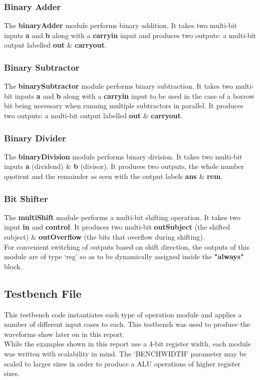 \documentclass[12pt]{article}
\begin{document}
\subsubsection{Binary Adder}
The \textbf{binaryAdder} module performs binary addition. It takes two multi-bit inputs \textbf{a} and \textbf{b} along with a \textbf{carryin} input and produces two outputs: a multi-bit output labelled \textbf{out} \& \textbf{carryout}.



\subsubsection{Binary Subtractor}
The \textbf{binarySubtractor}  module performs binary subtraction. It takes two multi-bit inputs \textbf{a} and \textbf{b} along with a \textbf{carryin} input to be used in the case of a borrow bit being necessary when running multiple subtractors in parallel. It produces two outputs: a multi-bit output labelled \textbf{out} \& \textbf{carryout}.


\subsubsection{Binary Divider}
The \textbf{binaryDivision} module performs binary division. It takes two multi-bit inputs \textbf{a} (dividend) \& \textbf{b} (divisor). It produces two outputs, the whole number quotient and the remainder as seen with the output labels \textbf{ans} \& \textbf{rem}.


\subsubsection{Bit Shifter}
The \textbf{multiShift} module performs a multi-bit shifting operation. It takes two input \textbf{in} and \textbf{control}.
It produces two multi-bit \textbf{outSubject} (the shifted subject) \& \textbf{outOverflow} (the bits that overflow during shifting).\\
For convenient switching of outputs based on shift direction, 
the outputs of this module are of type `reg' so as to be dynamically assigned inside the \textbf{"always"} block.


\newpage
\subsection{Testbench File}
This testbench code instantiates each type of operation module and applies a number of different input cases to each. This testbench was used to produce the waveforms show later on in this report.\\
While the examples shown in this report use a 4-bit register width, each module was written with scalability in mind. The `BENCHWIDTH' parameter may be scaled to larger sizes in order to produce a ALU operations of higher register sizes.

\end{document}
